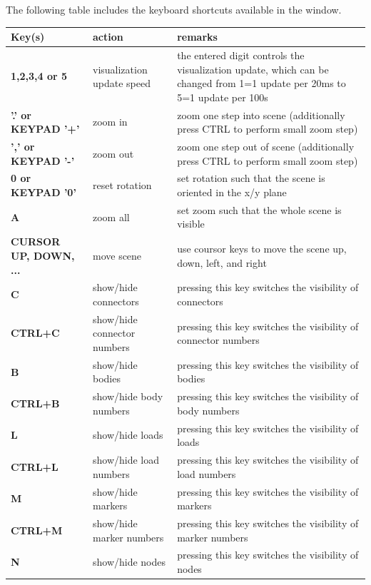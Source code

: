 \documentclass[11pt,a4paper]{book} %
\begin{document}
The following table includes the keyboard shortcuts available in the window. 

\begin{center}
  \footnotesize
  \begin{longtable}{| p{4cm} | p{4cm} | p{8cm} |} 
	\hline
  \bf Key(s) & action & \bf remarks \\ \hline
  \bf 1,2,3,4 or 5 & visualization update speed & the entered digit controls the visualization update, which can be changed from 1=1 update per 20ms to 5=1 update per 100s\\ \hline
  \bf '.' or KEYPAD '+' & zoom in & zoom one step into scene (additionally press CTRL to perform small zoom step)\\ \hline
  \bf ',' or KEYPAD '-' & zoom out & zoom one step out of scene (additionally press CTRL to perform small zoom step)\\ \hline
  \bf 0 or KEYPAD '0'& reset rotation & set rotation such that the scene is oriented in the x/y plane \\ \hline
  \bf A & zoom all & set zoom such that the whole scene is visible \\ \hline
  \bf CURSOR UP, DOWN, ... & move scene& use coursor keys to move the scene up, down, left, and right \\ \hline
  \bf C & show/hide connectors & pressing this key switches the visibility of connectors \\ \hline
  \bf CTRL+C & show/hide connector numbers & pressing this key switches the visibility of connector numbers \\ \hline
	\bf B & show/hide bodies & pressing this key switches the visibility of bodies \\ \hline
  \bf CTRL+B & show/hide body numbers & pressing this key switches the visibility of body numbers \\ \hline
	\bf L & show/hide loads & pressing this key switches the visibility of loads \\ \hline
  \bf CTRL+L & show/hide load numbers & pressing this key switches the visibility of load numbers \\ \hline
	\bf M & show/hide markers & pressing this key switches the visibility of markers \\ \hline
  \bf CTRL+M & show/hide marker numbers & pressing this key switches the visibility of marker numbers \\ \hline
	\bf N & show/hide nodes & pressing this key switches the visibility of nodes \\ \hline

\end{longtable}
\end{center}
\end{document}
